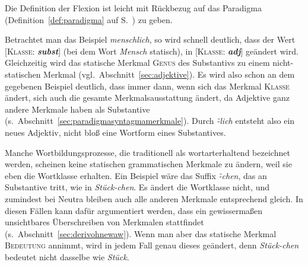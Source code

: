 
Die Definition der Flexion ist leicht mit Rückbezug auf das Paradigma (Definition~\ref{def:paradigma} auf S.~\pageref{def:paradigma}) zu geben.


Betrachtet man das Beispiel \textit{menschlich}, so wird schnell deutlich, dass der Wert [\textsc{Klasse}: \textit{\textbf{subst}}] (bei dem Wort \textit{Mensch} statisch), in [\textsc{Klasse}: \textit{\textbf{adj}}] geändert wird.
Gleichzeitig wird das statische Merkmal \textsc{Genus} des Substantivs zu einem nicht-statischen Merkmal (vgl.\ Abschnitt~\ref{sec:adjektive}).
Es wird also schon an dem gegebenen Beispiel deutlich, dass immer dann, wenn sich das Merkmal \textsc{Klasse} ändert, sich auch die gesamte Merkmalsausstattung ändert, da Adjektive \zB ganz andere Merkmale haben als Substantive (s.\ Abschnitt~\ref{sec:paradigmasyntagmamerkmale}).
Durch \mbox{\textit{\~-lich}} entsteht also ein neues Adjektiv, nicht bloß eine Wortform eines Substantives.

Manche Wortbildungsprozesse, die traditionell als wortarterhaltend bezeichnet werden, scheinen keine statischen grammatischen Merkmale zu ändern, weil sie eben die Wortklasse erhalten.
Ein Beispiel wäre das Suffix \mbox{\textit{\~-chen}}, das an Substantive tritt, wie in \textit{Stück-chen}.
Es ändert die Wortklasse nicht, und zumindest bei Neutra bleiben auch alle anderen Merkmale entsprechend gleich.
In diesen Fällen kann dafür argumentiert werden, dass ein gewissermaßen unsichtbares Überschreiben von Merkmalen stattfindet (s.\ Abschnitt~\ref{sec:derivohnewaw}).
Wenn man aber das statische Merkmal \textsc{Bedeutung} annimmt, wird in jedem Fall genau dieses geändert, denn \textit{Stück-chen} bedeutet nicht dasselbe wie \textit{Stück}.

